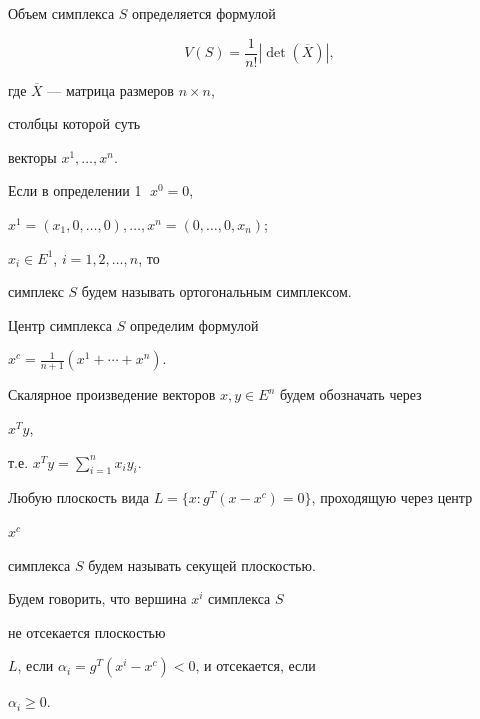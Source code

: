 Объем симплекса $S$ определяется формулой


$$


V(S)=\frac{1}{n!}|\det(\overline X)|,


$$


где $\overline X$ --- матрица размеров $n\times n$,


столбцы которой суть


векторы $x^1,\dotsc,x^n$.





\begin{defn}


Если в определении 1 $\;x^0=0$,


$x^1=(x_1,0,\dotsc,0),\dotsc,x^n=(0,\dotsc,0,x_n)$;


$x_i\in E^1$, $i=1,2,\dotsc,n$, то


симплекс $S$ будем называть ортогональным симплексом.


\end{defn}





\begin{defn}


Центр симплекса $S$ определим формулой


$x^c=\frac{1}{n+1}(x^1+\dotsb+x^n)$.


\end{defn}





Скалярное произведение векторов $x,y\in E^n$ будем обозначать через


$x^Ty$,


т.е. $x^Ty=\sum\limits^n_{i=1}x_iy_i$.





\begin{defn}


Любую плоскость вида $L=\{x:g^T(x-x^c)=0\}$, проходящую через центр


$x^c$


симплекса $S$ будем называть секущей плоскостью.


\end{defn}





\begin{defn}


Будем говорить, что вершина $x^i$ симплекса $S$


не отсекается плоскостью


$L$, если $\alpha_i=g^T(x^i-x^c)<0$, и отсекается, если


$\alpha_i\ge 0$.


\end{defn}





